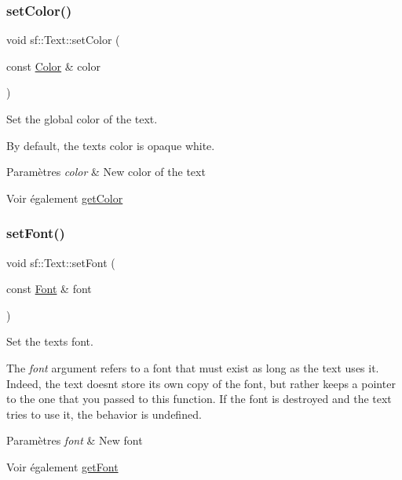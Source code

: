 \subsubsection{\texorpdfstring{set\+Color()}{setColor()}}
{\footnotesize\ttfamily void sf\+::\+Text\+::set\+Color (\begin{DoxyParamCaption}\item[{const \hyperlink{classsf_1_1Color}{Color} \&}]{color }\end{DoxyParamCaption})}



Set the global color of the text. 

By default, the text\textquotesingle{}s color is opaque white.


\begin{DoxyParams}{Paramètres}
{\em color} & New color of the text\\
\hline
\end{DoxyParams}
\begin{DoxySeeAlso}{Voir également}
\hyperlink{classsf_1_1Text_ae4ca753f719c54692fd4d9284573a2c7}{get\+Color} 
\end{DoxySeeAlso}
\mbox{\label{classsf_1_1Text_a2927805d1ae92d57f15034ea34756b81}} 
\subsubsection{\texorpdfstring{set\+Font()}{setFont()}}
{\footnotesize\ttfamily void sf\+::\+Text\+::set\+Font (\begin{DoxyParamCaption}\item[{const \hyperlink{classsf_1_1Font}{Font} \&}]{font }\end{DoxyParamCaption})}



Set the text\textquotesingle{}s font. 

The {\itshape font} argument refers to a font that must exist as long as the text uses it. Indeed, the text doesn\textquotesingle{}t store its own copy of the font, but rather keeps a pointer to the one that you passed to this function. If the font is destroyed and the text tries to use it, the behavior is undefined.


\begin{DoxyParams}{Paramètres}
{\em font} & New font\\
\hline
\end{DoxyParams}
\begin{DoxySeeAlso}{Voir également}
\hyperlink{classsf_1_1Text_a47cd96d7b2c37b2f820e4d6e1bb83f96}{get\+Font} 
\end{DoxySeeAlso}
\mbox{\label{classsf_1_1Text_a7d3b3359f286fd9503d1ced25b7b6c33}} 
